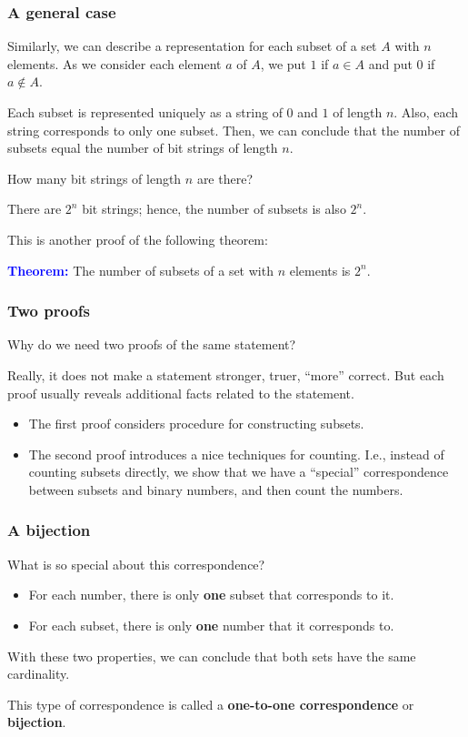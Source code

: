 \begin{frame}\frametitle{A general case}
  Similarly, we can describe a representation for each subset of a set
  $A$ with $n$ elements.  As we consider each element $a$ of $A$, we
  put $1$ if $a\in A$ and put $0$ if $a\not\in A$.
  \pause

  Each subset is represented uniquely as a string of $0$ and $1$ of
  length $n$.  Also, each string corresponds to only one subset.
  Then, we can conclude that the number of subsets equal the number of
  bit strings of length $n$.
  \pause

  How many bit strings of length $n$ are there?
  \pause

  \vspace{0.1in}

  There are $2^n$ bit strings; hence, the number of subsets is also
  $2^n$.
  \pause
  
  This is another proof of the following theorem:
  
  \begin{tcolorbox}
    {\bf \textcolor{blue}{Theorem:}} The number of subsets of a set with
    $n$ elements is $2^n$.
  \end{tcolorbox}
\end{frame}

\begin{frame}\frametitle{Two proofs}
  Why do we need two proofs of the same statement?
  \pause

  Really, it does not make a statement stronger, truer, ``more''
  correct.  But each proof usually reveals additional facts related to
  the statement.

  \begin{itemize}
  \item The first proof considers procedure for constructing subsets.
  \item The second proof introduces a nice techniques for counting.
    I.e., instead of counting subsets directly, we show that we have a
    ``special'' correspondence between subsets and binary numbers, and
    then count the numbers.
  \end{itemize}
\end{frame}

\begin{frame}\frametitle{A bijection}
  What is so special about this correspondence?
  \pause

  \begin{itemize}
  \item For each number, there is only {\bf one} subset that
    corresponds to it.
  \item For each subset, there is only {\bf one} number that it
    corresponds to.
  \end{itemize}

  With these two properties, we can conclude that both sets have the
  same cardinality.

  \begin{tcolorbox}
    This type of correspondence is called a {\bf
      one-to-one correspondence} or {\bf bijection}.
  \end{tcolorbox}
\end{frame}
